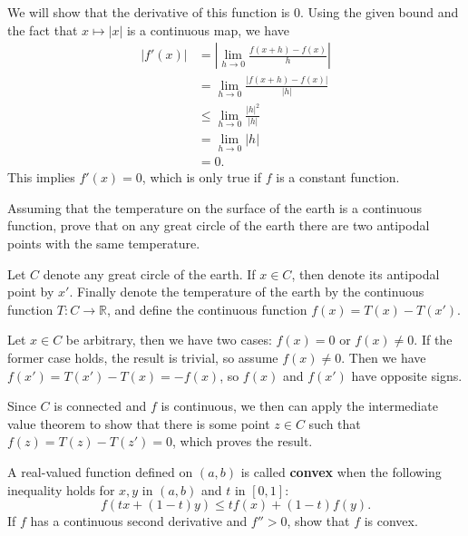 \documentclass[10pt]{amsart}
\newenvironment{exercise}[1]{%
        \vspace{10mm}
        \renewcommand\themanualtheoreminner{#1}%
  \manualtheoreminner
}\hrulefill{\endmanualtheoreminner}
\begin{document}
We will show that the derivative of this function is 0. Using the given bound and the fact that $x \mapsto |x|$ is a continuous map, we have
\begin{align*}
	|f'(x)| &= \left| \lim_{h \to 0} \frac{f(x+h)-f(x)}{h} \right| \\
		&= \lim_{h \to 0} \frac{|f(x+h)-f(x)|}{|h|} \\
		&\leq \lim_{h \to 0} \frac{|h|^2}{|h|} \\
		&= \lim_{h \to 0} |h| \\
		&= 0.
\end{align*}
This implies $f'(x) = 0$, which is only true if $f$ is a constant function.

\begin{exercise}{34}
	Assuming that the temperature on the surface of the earth is a continuous function, prove that on any great circle of the earth there are two antipodal points with the same temperature.
\end{exercise}

Let $C$ denote any great circle of the earth. If $x \in C$, then denote its antipodal point by $x'$. Finally denote the temperature of the earth by the continuous function $T: C \to \mathbb{R}$, and define the continuous function $f(x) = T(x) - T(x')$.

Let $x \in C$ be arbitrary, then we have two cases: $f(x) = 0$ or $f(x) \neq 0$. If the former case holds, the result is trivial, so assume $f(x) \neq 0$. Then we have $f(x') = T(x') - T(x) = -f(x)$, so $f(x)$ and $f(x')$ have opposite signs.

Since $C$ is connected and $f$ is continuous, we then can apply the intermediate value theorem to show that there is some point $z \in C$ such that $f(z) = T(z) - T(z') = 0$, which proves the result.

\begin{exercise}{38}
	A real-valued function defined on $(a,b)$ is called \textbf{convex} when the following inequality holds for $x,y$ in $(a,b)$ and $t$ in $[0,1]$:
	\[
		f(tx + (1-t)y) \leq tf(x) + (1-t)f(y).
	\] If $f$ has a continuous second derivative and $f''>0$, show that $f$ is convex.
\end{exercise}
\end{document}
